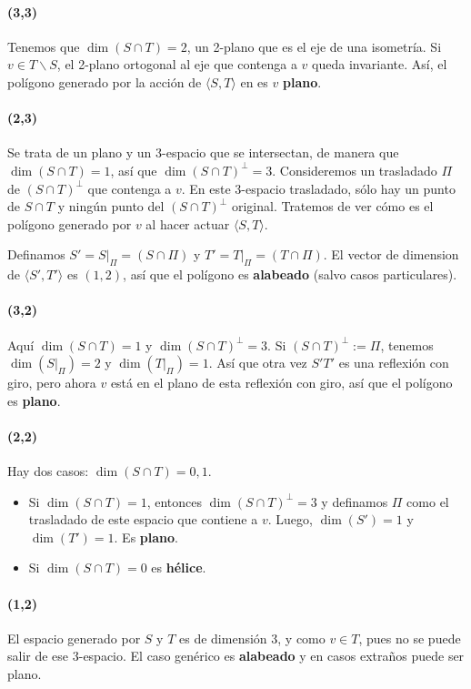 \documentclass[spanish]{article}
\theoremstyle{definition}
\begin{document}
\paragraph{\textbf{(3,3)}} Tenemos que $\dim(S\cap T)=2$, un 2-plano que es el eje de una isometría. Si $v\in T\backslash S$, el 2-plano ortogonal al eje que contenga a $v$ queda invariante. Así, el polígono generado por la acción de $\langle S,T\rangle$ en es $v$ \textbf{plano}.

\paragraph{\textbf{(2,3)}} Se trata de un plano y un 3-espacio que se intersectan, de manera que $\dim(S\cap T)=1$, así que $\dim(S\cap T)^\perp=3$. Consideremos un trasladado $\Pi$ de $(S\cap T)^\perp$ que contenga a $v$. En este 3-espacio trasladado, sólo hay un punto de $S\cap T$ y ningún punto del $(S\cap T)^\perp$ original. Tratemos de ver cómo es el polígono generado por $v$ al hacer actuar $\langle S,T\rangle$.

Definamos $S'=S|_\Pi=(S\cap\Pi)$ y $T'=T|_\Pi=(T\cap\Pi)$. El vector de dimension de $\langle S',T'\rangle$ es $(1,2)$, así que el polígono es \textbf{alabeado} (salvo casos particulares).

\paragraph{\textbf{(3,2)}} Aquí $\dim(S\cap T)=1$ y $\dim(S\cap T)^\perp=3$. Si $(S\cap T)^\perp:=\Pi$, tenemos $\dim(S|_\Pi)=2$ y $\dim(T|_\Pi)=1$. Así que otra vez $S'T'$ es una reflexión con giro, pero ahora $v$ está en el plano de esta reflexión con giro, así que el polígono es \textbf{plano}.

\paragraph{\textbf{(2,2)}} Hay dos casos: $\dim(S\cap T)=0,1$.
\begin{itemize}
	\item Si $\dim(S\cap T)=1$, entonces $\dim(S\cap T)^\perp=3$ y definamos $\Pi$ como el trasladado de este espacio que contiene a $v$. Luego, $\dim(S')=1$ y $\dim(T')=1$. Es \textbf{plano}.
	\item Si $\dim(S\cap T)=0$ es \textbf{hélice}.
\end{itemize}

\paragraph{\textbf{(1,2)}} El espacio generado por $S$ y $T$ es de dimensión 3, y como $v\in T$, pues no se puede salir de ese 3-espacio. El caso genérico es \textbf{alabeado} y en casos extraños puede ser plano.
\end{document}
